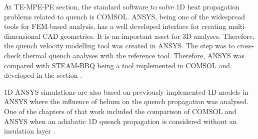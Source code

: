 
At TE-MPE-PE section, the standard software to solve 1D heat propagation problems related to quench is COMSOL. ANSYS, being one of the widespread tools for FEM-based analysis, has a well developed interface for creating multi-dimensional CAD geometries. It is an important asset for 3D analyses.
Therefore, the quench velocity modelling tool was created in ANSYS. The  step was to cross-check thermal quench analyses with the reference tool. Therefore, ANSYS was compared with STEAM-BBQ being a tool implemented in COMSOL and developed in the section \cite{BBQ_manual}.

1D ANSYS simulations are also based on previously implemented 1D models in ANSYS where the influence of helium on the quench propagation was analysed. One of the chapters of that work included the comparison of COMSOL and ANSYS when an adiabatic 1D quench propagation is considered without an insulation layer \cite{paudel_thesis}. 

